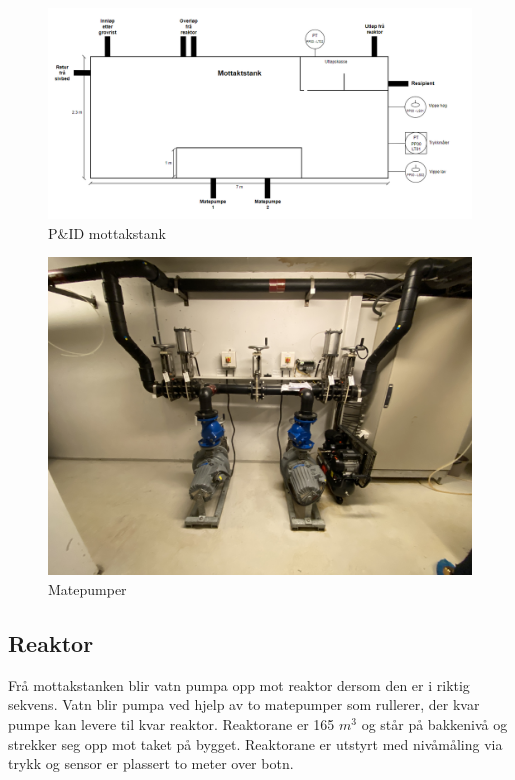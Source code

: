 
\begin{figure}[htbp]
    \centering
    \includegraphics[width=1\textwidth]{Figurar/Mottakstank.png}
    \caption{P\&ID mottakstank}\label{fig:Mottakstank}
\end{figure}

\begin{figure}[htbp]
    \centering
    \includegraphics[width=1\textwidth]{Bilder/Bilde pumper.jpg}
    \caption{Matepumper}\label{fig:Matepumper}
\end{figure}

\newpage
\subsection{Reaktor}

Frå mottakstanken blir vatn pumpa opp mot reaktor dersom den er i riktig sekvens.
Vatn blir pumpa ved hjelp av to matepumper som rullerer, der kvar pumpe kan levere til kvar reaktor. 
Reaktorane er 165 $m^3$ og står på bakkenivå og strekker seg opp mot taket på bygget.
Reaktorane er utstyrt med nivåmåling via trykk og sensor er plassert to meter over botn.

